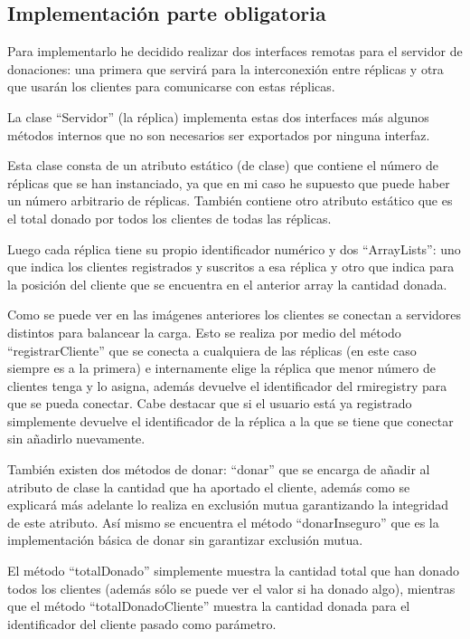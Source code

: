 \documentclass{article}
\begin{document}
\subsection{Implementación parte obligatoria}
Para implementarlo he decidido realizar dos interfaces remotas para el servidor de donaciones: una primera que servirá para la interconexión entre réplicas y otra que usarán los clientes para comunicarse con estas réplicas.


La clase ``Servidor'' (la réplica) implementa estas dos interfaces más algunos métodos internos que no son necesarios ser exportados por ninguna interfaz.

Esta clase consta de un atributo estático (de clase) que contiene el número de réplicas que se han instanciado, ya que en mi caso he supuesto que puede haber un número arbitrario de réplicas. También contiene otro atributo estático que es el total donado por todos los clientes de todas las réplicas.

Luego cada réplica tiene su propio identificador numérico y dos ``ArrayLists'': uno que indica los clientes registrados y suscritos a esa réplica y otro que indica para la posición del cliente que se encuentra en el anterior array la cantidad donada.


Como se puede ver en las imágenes anteriores los clientes se conectan a servidores distintos para balancear la carga. Esto se realiza por medio del método ``registrarCliente'' que se conecta a cualquiera de las réplicas (en este caso siempre es a la primera) e internamente elige la réplica que menor número de clientes tenga y lo asigna, además devuelve el identificador del rmiregistry para que se pueda conectar. Cabe destacar que si el usuario está ya registrado simplemente devuelve el identificador de la réplica a la que se tiene que conectar sin añadirlo nuevamente.

También existen dos métodos de donar: ``donar'' que se encarga de añadir al atributo de clase la cantidad que ha aportado el cliente, además como se explicará más adelante lo realiza en exclusión mutua garantizando la integridad de este atributo. Así mismo se encuentra el método ``donarInseguro'' que es la implementación básica de donar sin garantizar exclusión mutua.

El método ``totalDonado'' simplemente muestra la cantidad total que han donado todos los clientes (además sólo se puede ver el valor si ha donado algo), mientras que el método ``totalDonadoCliente'' muestra la cantidad donada para el identificador del cliente pasado como parámetro.
\end{document}
